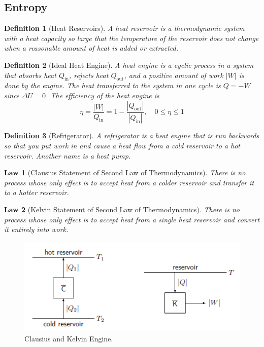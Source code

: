\documentclass[a4paper]{article}
\theoremstyle{new}
\newtheorem{law}{Law}[section]
\newtheorem{defi}{Definition}[section]
\begin{document}
\subsection{Entropy}
\begin{defi}[Heat Reservoirs]
A heat reservoir is a thermodynamic system with a heat capacity so large that the temperature of the reservoir does not change when a reasonable amount of heat is added or extracted. 
\end{defi}
\begin{defi}[Ideal Heat Engine]
A heat engine is a cyclic process in a system that absorbs heat $Q_{\text{in}}$, rejects heat $Q_{\text{out}}$, and a positive amount of work $|W|$ is done by the engine. The heat transferred to the system in one cycle is $Q=-W$ since $\Delta U=0$. The efficiency of the heat engine is 
\begin{equation}
\eta=\frac{|W|}{Q_{\text{in}}}=1-\frac{|Q_{\text{out}}|}{|Q_{\text{in}}|},\quad0\leq\eta\leq 1\label{efficiency}
\end{equation}
\end{defi}
\begin{defi}[Refrigerator]
A refrigerator is a heat engine that is run backwards so that you put work in and cause a heat flow from a cold reservoir to a hot reservoir. Another name is a heat pump.
\end{defi}
\begin{law}[Clausius Statement of Second Law of Thermodynamics]
There is no process whose only effect is to accept heat from a colder reservoir and transfer it to a hotter reservoir.
\end{law}
\begin{law}[Kelvin Statement of Second Law of Thermodynamics]
There is no process whose only effect is to accept heat from a single heat reservoir and convert it entirely into work.
\end{law}
\begin{figure}[H]
    \centering
    \includegraphics[scale=0.8]{secondlaw1.PNG}
    \caption{Clausius and Kelvin Engine. \cite{blundell2010concepts}}
\end{figure}
\end{document}
